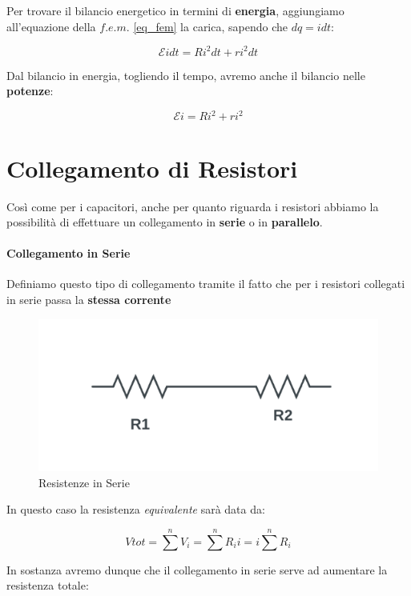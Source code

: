 Per trovare il bilancio energetico in termini di \textbf{energia}, aggiungiamo all'equazione della $f.e.m.$ \ref{eq_fem} la carica, sapendo che $dq = idt$: 

\begin{equation} \label{eq_bilancio_energia}
	\mathcal{E}idt = Ri^2dt + ri^2dt
\end{equation}

Dal bilancio in energia, togliendo il tempo, avremo anche il bilancio nelle \textbf{potenze}: 

\begin{equation}
	\label{eq_bilancio_potenza}
	\mathcal{E}i = Ri^2 + ri^2
\end{equation}

\section{Collegamento di Resistori}
Così come per i capacitori, anche per quanto riguarda i resistori abbiamo la possibilità di effettuare un collegamento in \textbf{serie} o in \textbf{parallelo}. 

\paragraph{Collegamento in Serie}
Definiamo questo tipo di collegamento tramite il fatto che per i resistori collegati in serie passa la \textbf{stessa corrente}

\begin{figure}[th]
	\centering
	\includegraphics[width=0.5\linewidth]{Media/Resistenze_serie}
	\caption{Resistenze in Serie}
	\label{fig:resistenzeserie}
\end{figure}

In questo caso la resistenza \textit{equivalente} sarà data da: 

\begin{equation}
	\label{eq_serie}
	V{tot} = \sum^n V_i = \sum^n R_i i  = i \sum^n R_i
\end{equation}

In sostanza avremo dunque che il collegamento in serie serve ad aumentare la resistenza totale: 

